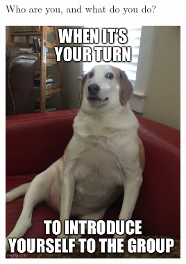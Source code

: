 \documentclass[
  ignorenonframetext,
]{beamer}
\begin{document}
\begin{frame}{Who are you, and what do you do?}
\protect\hypertarget{who-are-you-and-what-do-you-do}{}
\center

\includegraphics[width=0.5\textwidth,height=\textheight]{introductions.jpg}
\end{frame}
\end{document}
